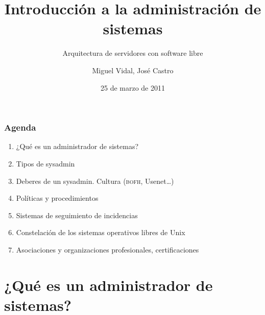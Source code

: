 \documentclass{beamer}
\begin{document}
\title{Introducción a la administración de sistemas}
\subtitle{Arquitectura de servidores con software libre}
\author{Miguel Vidal, Jos\'{e} Castro}
\date{25 de marzo de 2011}



\begin{frame}
  \frametitle{Agenda}

\begin{enumerate}
\item ¿Qué es un administrador de sistemas? 
\item Tipos de sysadmin
\item Deberes de un sysadmin. Cultura (\textsc{bofh}, Usenet\dots)
\item Políticas y procedimientos
\item Sistemas de seguimiento de incidencias
\item Constelación de los sistemas operativos libres de Unix
\item Asociaciones y organizaciones profesionales, certificaciones     
\end{enumerate}

\end{frame}

\section{¿Qué es un administrador de sistemas?}
\end{document}
